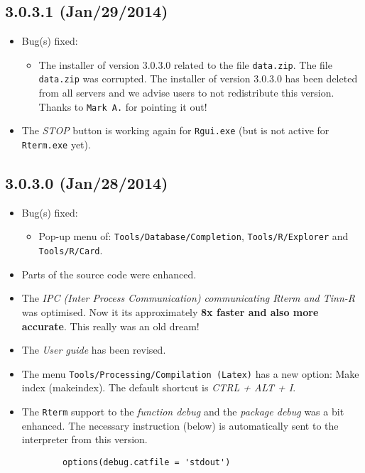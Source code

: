 \subsection*{3.0.3.1 (Jan/29/2014)}
\begin{itemize}
  \item Bug(s) fixed:
    \begin{itemize}
      \item The installer of version 3.0.3.0 related to the file \texttt{data.zip}.
       The file \texttt{data.zip} was corrupted. The installer of version 3.0.3.0 has been deleted from all servers
       and we advise users to not redistribute this version. Thanks to \texttt{Mark A.} for pointing it out!
    \end{itemize}
  \item The \textit{STOP} button is working again for \texttt{Rgui.exe} (but is not active for \texttt{Rterm.exe} yet).
\end{itemize}


\subsection*{3.0.3.0 (Jan/28/2014)}
\begin{itemize}
  \item Bug(s) fixed:
    \begin{itemize}
      \item Pop-up menu of: \texttt{Tools/Database/Completion},
       \texttt{Tools/R/Explorer} and \texttt{Tools/R/Card}.
    \end{itemize}
  \item Parts of the source code were enhanced.
  \item The \textit{IPC (Inter Process Communication) communicating Rterm and Tinn-R} was optimised.
   Now it its approximately \textbf{8x faster and also more accurate}. This really was an old dream!
  \item The \textit{User guide} has been revised.
  \item The menu \texttt{Tools/Processing/Compilation (Latex)} has a new option: Make index (makeindex).
   The default shortcut is \textit{CTRL + ALT + I}.
  \item The \texttt{Rterm} support to the \textit{function debug} and the \textit{package debug} was a bit enhanced.
   The necessary instruction (below) is automatically sent to the \RR{} interpreter from this version.

    \begin{footnotesize}
      \begin{verbatim}
        options(debug.catfile = 'stdout')
      \end{verbatim}
    \end{footnotesize}
\end{itemize}


